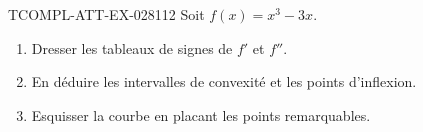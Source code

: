 \begin{exercice}{TCOMPL-ATT-EX-028}{1}{12}
Soit $f(x) = x^3 - 3x$.
\begin{enumerate}
  \item Dresser les tableaux de signes de $f'$ et $f''$.
  \item En déduire les intervalles de convexité et les points d'inflexion.
  \item Esquisser la courbe en placant les points remarquables.
\end{enumerate}

\end{exercice}
